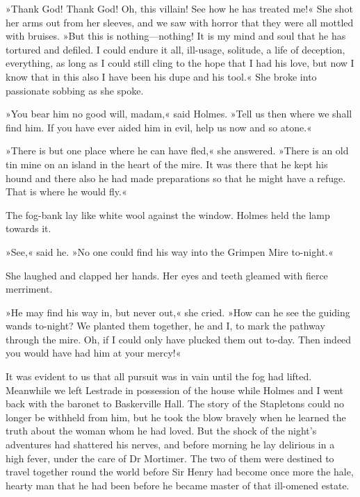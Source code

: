 »Thank God! Thank God! Oh, this villain! See how he has treated me!« She shot her arms out from her sleeves, and we saw with horror that they were all mottled with bruises. »But this is nothing—nothing! It is my mind and soul that he has tortured and defiled. I could endure it all, ill-usage, solitude, a life of deception, everything, as long as I could still cling to the hope that I had his love, but now I know that in this also I have been his dupe and his tool.« She broke into passionate sobbing as she spoke.

»You bear him no good will, madam,« said Holmes. »Tell us then where we shall find him. If you have ever aided him in evil, help us now and so atone.«

»There is but one place where he can have fled,« she answered. »There is an old tin mine on an island in the heart of the mire. It was there that he kept his hound and there also he had made preparations so that he might have a refuge. That is where he would fly.«

The fog-bank lay like white wool against the window. Holmes held the lamp towards it.

»See,« said he. »No one could find his way into the Grimpen Mire to-night.«

She laughed and clapped her hands. Her eyes and teeth gleamed with fierce merriment.

»He may find his way in, but never out,« she cried. »How can he see the guiding wands to-night? We planted them together, he and I, to mark the pathway through the mire. Oh, if I could only have plucked them out to-day. Then indeed you would have had him at your mercy!«

It was evident to us that all pursuit was in vain until the fog had lifted. Meanwhile we left Lestrade in possession of the house while Holmes and I went back with the baronet to Baskerville Hall. The story of the Stapletons could no longer be withheld from him, but he took the blow bravely when he learned the truth about the woman whom he had loved. But the shock of the night's adventures had shattered his nerves, and before morning he lay delirious in a high fever, under the care of Dr Mortimer. The two of them were destined to travel together round the world before Sir Henry had become once more the hale, hearty man that he had been before he became master of that ill-omened estate.

